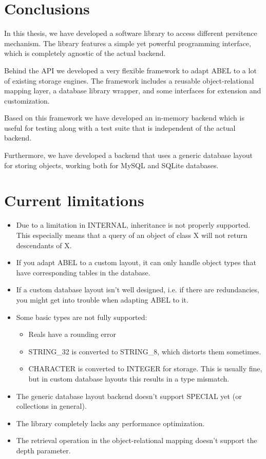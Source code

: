\section{Conclusions}

In this thesis, we have developed a software library to access different persitence mechanism.
The library features a simple yet powerful programming interface, which is completely agnostic of the actual backend.

Behind the API we developed a very flexible framework to adapt ABEL to a lot of existing storage engines.
The framework includes a reusable object-relational mapping layer, a database library wrapper, and some interfaces for extension and customization.

Based on this framework we have developed an in-memory backend which is useful for testing along with a test suite that is independent of the actual backend.

Furthermore, we have developed a backend that uses a generic database layout for storing objects, working both for MySQL and SQLite databases.

\section{Current limitations}

\begin{itemize}
\item Due to a limitation in INTERNAL, inheritance is not properly supported.
This especially means that a query of an object of class X will not return descendants of X.
\item If you adapt ABEL to a custom layout, it can only handle object types that have corresponding tables in the database.
\item If a custom database layout isn't well designed, i.e. if there are redundancies, you might get into trouble when adapting ABEL to it.
\item Some basic types are not fully supported:
\begin{itemize}
	\item Reals have a rounding error
	\item STRING\_32 is converted to STRING\_8, which distorts them sometimes.
	\item CHARACTER is converted to INTEGER for storage.
	This is usually fine, but in custom database layouts this results in a type mismatch.
\end{itemize}
\item The generic database layout backend doesn't support SPECIAL yet (or collections in general).
\item The library completely lacks any performance optimization.
\item The retrieval operation in the object-relational mapping doesn't support the depth parameter.
\end{itemize}

